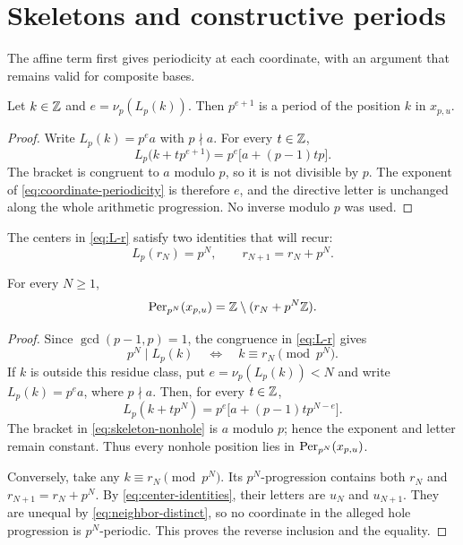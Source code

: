 \section{Skeletons and constructive periods}
\label{sec:skeletons}

The affine term first gives periodicity at each coordinate, with an
argument that remains valid for composite bases.

\begin{lemma}
\label{lem:coordinate-periodicity}
  Let $k\in\mathbb Z$ and $e=\nu_p(L_p(k))$.  Then $p^{e+1}$ is a period of the
  position $k$ in $x_{p,u}$.
\end{lemma}

\begin{proof}
  Write $L_p(k)=p^e a$ with $p\nmid a$.  For every $t\in\mathbb Z$,
  \begin{equation}
    L_p\bigl(k+t p^{e+1}\bigr)
      =p^e\bigl[a+(p-1)tp\bigr].
    \label{eq:coordinate-periodicity}
  \end{equation}
  The bracket is congruent to $a$ modulo $p$, so it is not divisible by
  $p$.  The exponent of \cref{eq:coordinate-periodicity} is therefore
  $e$, and the directive letter is unchanged along the whole arithmetic
  progression.  No inverse modulo $p$ was used.
\end{proof}

The centers in \cref{eq:L-r} satisfy two identities that will recur:
\begin{equation}
  L_p(r_N)=p^N,
  \qquad
  r_{N+1}=r_N+p^N.
  \label{eq:center-identities}
\end{equation}

\begin{theorem}
\label{thm:exact-skeleton}
  For every $N\geq1$,
  \[
    \operatorname{Per}_{p^N}(x_{p,u})=\mathbb Z\setminus(r_N+p^N\mathbb Z).
  \]
\end{theorem}

\begin{proof}
  Since $\gcd(p-1,p)=1$, the congruence in \cref{eq:L-r} gives
  \begin{equation}
    p^N\mid L_p(k)
      \quad\Longleftrightarrow\quad
    k\equiv r_N\pmod {p^N}.
    \label{eq:hole-congruence}
  \end{equation}
  If $k$ is outside this residue class, put
  $e=\nu_p(L_p(k))<N$ and write $L_p(k)=p^e a$, where $p\nmid a$.  Then,
  for every $t\in\mathbb Z$,
  \begin{equation}
    L_p(k+t p^N)
       =p^e\bigl[a+(p-1)t p^{N-e}\bigr].
    \label{eq:skeleton-nonhole}
  \end{equation}
  The bracket in \cref{eq:skeleton-nonhole} is $a$ modulo $p$; hence the
  exponent and letter remain constant.  Thus every nonhole position lies
  in $\operatorname{Per}_{p^N}(x_{p,u})$.

  Conversely, take any $k\equiv r_N\pmod {p^N}$.  Its $p^N$-progression
  contains both $r_N$ and $r_{N+1}=r_N+p^N$.  By
  \cref{eq:center-identities}, their letters are $u_N$ and $u_{N+1}$.
  They are unequal by \cref{eq:neighbor-distinct}, so no coordinate in the
  alleged hole progression is $p^N$-periodic.  This proves the reverse
  inclusion and the equality.
\end{proof}

